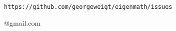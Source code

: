 \documentclass[12pt]{article}
\begin{document}
\begin{center}
\verb$https://github.com/georgeweigt/eigenmath/issues$

@gmail.com
\end{center}
\end{document}
